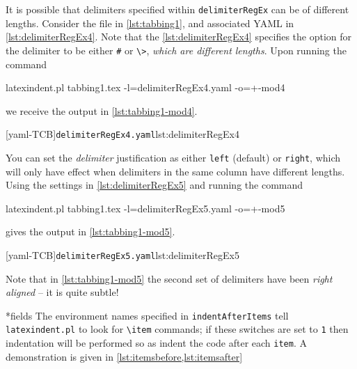 	It is possible that delimiters specified within \texttt{delimiterRegEx} can be of
	different lengths. Consider the file in \cref{lst:tabbing1}, and associated YAML in
	\cref{lst:delimiterRegEx4}. Note that the
	\cref{lst:delimiterRegEx4} specifies the option for the delimiter to be either
	\lstinline!#! or
	\lstinline!\>!, \emph{which are different lengths}. Upon running the command
	\begin{commandshell}
latexindent.pl tabbing1.tex -l=delimiterRegEx4.yaml -o=+-mod4
\end{commandshell}
	we receive the output in \cref{lst:tabbing1-mod4}.

	\begin{cmhtcbraster}[raster columns=3,
			raster left skip=-3.5cm,
			raster right skip=-2cm,
			raster column skip=.03\linewidth]
		[yaml-TCB]{\texttt{delimiterRegEx4.yaml}}{lst:delimiterRegEx4}
	\end{cmhtcbraster}

	You can set the \emph{delimiter} justification as either \texttt{left} (default)
	or \texttt{right}, which will only have effect when delimiters in the same
	column have different lengths. Using the settings in \cref{lst:delimiterRegEx5} and running
	the command
	\begin{commandshell}
latexindent.pl tabbing1.tex -l=delimiterRegEx5.yaml -o=+-mod5
\end{commandshell}
	gives the output in \cref{lst:tabbing1-mod5}.

	\begin{cmhtcbraster}
		[yaml-TCB]{\texttt{delimiterRegEx5.yaml}}{lst:delimiterRegEx5}
	\end{cmhtcbraster}

	Note that in \cref{lst:tabbing1-mod5} the second set of delimiters have been
	\emph{right aligned} -- it is quite subtle!

*{fields}
	The environment names specified in \texttt{indentAfterItems} tell \texttt{latexindent.pl}
	to look for \lstinline!\item! commands; if these switches are set to
	\texttt{1} then indentation will be performed so as indent the code after
	each \texttt{item}. A demonstration is given in \cref{lst:itemsbefore,lst:itemsafter}

